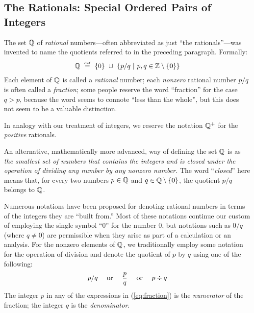 \subsection{The Rationals: Special Ordered Pairs of Integers}
\label{sec:define-rationals}

 
 
The set $\mathbb{Q}$ of {\it rational} numbers---often abbreviated as just ``the rationals''---was invented to name the quotients referred to in the preceding paragraph.  Formally:
\[ \mathbb{Q} \ \stackrel{\mbox{{\tiny def}}}{=} \ \{0\} \ \cup \ \left\{ p/q \ | \ p, q \in \mathbb{Z}
\setminus \{0\} \right\}
\]
Each element of $\mathbb{Q}$ is called a {\it rational} number; each {\em nonzero} rational number $p/q$ is often called a {\em fraction}; some people reserve the word ``fraction'' for the case $q > p$, because the word seems to connote ``less than the whole'', but this does not seem to be a valuable distinction.

\smallskip

In analogy with our treatment of integers, we reserve the notation $\mathbb{Q}^+$ for the {\em positive} rationals.

\smallskip


An alternative, mathematically more advanced, way of defining the set $\mathbb{Q}$ is as {\em the smallest set of numbers that contains the integers and is closed under the operation of dividing any number by any nonzero number.}  The word ``{\it closed}'' here means that, for every two numbers $p \in \mathbb{Q}$ and $q \in \mathbb{Q} \setminus \{0\}$, the quotient $p/q$ belongs to $\mathbb{Q}$.

\smallskip

Numerous notations have been proposed for denoting rational numbers in terms of the integers they are ``built from.''  Most of these notations continue our custom of employing the single symbol ``$0$'' for the number $0$, but notations such as $0/q$ (where $q \neq 0$) are permissible when they arise as part of a calculation or an analysis.  For the nonzero elements of $\mathbb{Q}$, we traditionally employ some notation for the operation of division and denote the quotient of $p$ by $q$ using one of the following:
\begin{equation}
\label{eq:fraction}
 p/q \ \ \ \mbox{ or } \ \ \ {p \over q} \ \ \ \mbox{ or } \ \ \ p
 \div q
\end{equation}
The integer $p$ in any of the expressions in (\ref{eq:fraction}) is the {\it numerator} of the fraction; the integer $q$ is the {\it denominator}.
 
 

